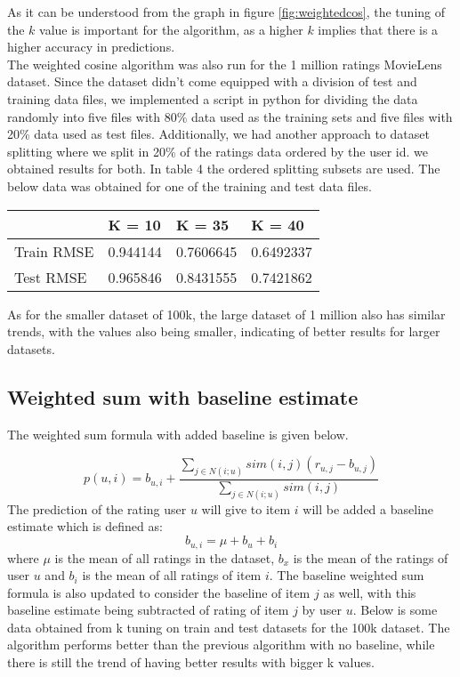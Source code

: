 \documentclass[a4paper]{article}
\begin{document}
As it can be understood from the graph in figure \ref{fig:weightedcos}, the tuning of the $k$ value is important for the algorithm, as a higher $k$ implies that there is a higher accuracy in predictions. \\ 
The weighted cosine algorithm was also run for the 1 million ratings MovieLens dataset. Since the dataset didn't come equipped with a division of test and training data files, we implemented a script in python for dividing the data randomly into five files with 80\% data used as the training sets and five files with 20\% data used as test files. Additionally, we had another approach to dataset splitting where we split in 20\% of the ratings data ordered by the user id. we obtained results for both. In table 4 the ordered splitting subsets are used. The below data was obtained for one of the training and test data files.
\begin{center}
    \begin{tabular}{| l | l | l |l |}
    \hline
     & K = 10 & K = 35 & K = 40  \\ \hline
    Train RMSE &  0.944144 & 0.7606645 & 0.6492337   \\ \hline
    Test RMSE & 0.965846 & 0.8431555 & 0.7421862   \\ \hline
    \hline
    \end{tabular}
\end{center}
As for the smaller dataset of 100k, the large dataset of 1 million also has similar trends, with the values also being smaller, indicating of better results for larger datasets.   
\subsection{Weighted sum with baseline estimate}
The weighted sum formula with added baseline is given below.

$$p(u, i) = b_{u,i} + {\frac{\sum_{j \in N(i;u)}sim(i,j)(r_{u, j} - b_{u,j})}{\sum_{j \in N(i;u)}sim(i, j)}}$$
The prediction of the rating user $u$ will give to item $i$ will be added a baseline estimate which is defined as:
$$b_{u, i} = \mu + b_u + b_i$$
where $\mu$ is the mean of all ratings in the dataset, $b_x$ is the mean of the ratings of user $u$ and $b_i$ is the mean of all ratings of item $i$. The baseline weighted sum formula is also updated to consider the baseline of item $j$ as well, with this baseline estimate being subtracted of rating of item $j$ by user $u$. Below is some data obtained from k tuning on train and test datasets for the 100k dataset. The algorithm performs better than the previous algorithm with no baseline, while there is still the trend of having better results with bigger k values.  
\end{document}

